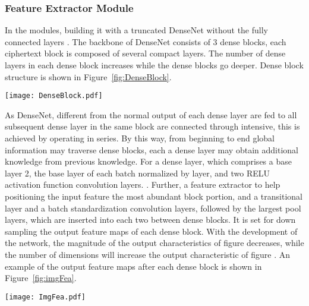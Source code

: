 \subsubsection{Feature Extractor Module}
\label{sec:MethNetFea}

In the modules, building it with a truncated 
DenseNet without the fully connected layers
\cite{Huang2017}. 
The backbone of DenseNet consists of 3 dense 
blocks, each ciphertext block is composed 
of several compact layers. 
The number of dense layers in each dense block 
increases while the dense blocks go deeper.
Dense block structure is shown in 
Figure~\ref{fig:DenseBlock}.

\begin{figure*}[!ht]
    \centering
    \texttt{[image: DenseBlock.pdf]}
    \caption{The architecture of DenseNet.}
    \label{fig:DenseBlock}
\end{figure*} 

As DenseNet, different from the normal output 
of each dense layer are fed to all subsequent 
dense layer in the same block are connected 
through intensive, this is achieved by 
operating in series.
By this way, from beginning to end global 
information may traverse dense blocks, each a 
dense layer may obtain additional knowledge 
from previous knowledge.
For a dense layer, which comprises a base 
layer 2, the base layer of each batch 
normalized by layer, and two RELU activation 
function convolution layers.
\cite{Srivastava2014,Ioffe2015,Kingma2015}. 
Further, a feature extractor to help 
positioning the input feature the most 
abundant block portion, and a transitional 
layer and a batch standardization convolution 
layers, followed by the largest pool layers, 
which are inserted into each two between 
dense blocks.
It is set for down sampling the output feature 
maps of each dense block. 
With the development of the network, the 
magnitude of the output characteristics of figure 
decreases, while the number of dimensions will 
increase the output characteristic of figure
\cite{Huang2017}.
An example of the output feature maps after 
each dense block is shown in 
Figure~\ref{fig:imgFea}.

\begin{figure*}[!ht]
    \centering
    \texttt{[image: ImgFea.pdf]}
    \caption{The feature of the 
        fusion of extractors' result.}
    \label{fig:imgFea}
\end{figure*} 

